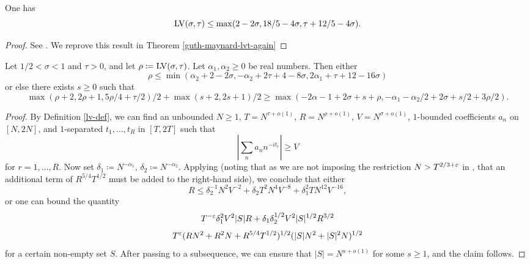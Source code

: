 \begin{theorem}\label{guth-maynard-lvt} One has
$$ \mathrm{LV}(\sigma,\tau) \leq \max(2-2\sigma, 18/5 - 4 \sigma, \tau + 12/5 - 4\sigma).$$
\end{theorem}

\begin{proof}
See \cite[Theorem~1.1]{guth-maynard}. We reprove this result in Theorem \ref{guth-maynard-lvt-again}
\end{proof}

\begin{theorem}\label{bourgain-lvt} \cite{bourgain_large_2000} Let $1/2 < \sigma < 1$ and $\tau > 0$, and let $\rho \coloneqq \mathrm{LV}(\sigma,\tau)$.  Let $\alpha_1, \alpha_2 \geq 0$ be real numbers.  Then either
$$ \rho \leq \min( \alpha_2 + 2 - 2 \sigma, -\alpha_2 + 2\tau+4-8\sigma, 2\alpha_1 + \tau + 12 - 16 \sigma)$$
or else there exists $s \geq 0$ such that
\begin{equation}\label{rs}
     \max(\rho+2, 2\rho+1, 5\rho/4 + \tau/2)/2 + \max(s+2, 2s+1)/2 \geq
\max( -2\alpha-1 + 2\sigma + s + \rho, -\alpha_1 - \alpha_2/2 + 2\sigma + s/2 + 3\rho/2).
\end{equation}
\end{theorem}

\begin{proof}  By Definition \ref{lv-def}, we can find an unbounded $N \geq 1$, $T = N^{\tau+o(1)}$, $R = N^{\rho+o(1)}$, $V = N^{\sigma+o(1)}$, $1$-bounded coefficients $a_n$ on $[N,2N]$, and $1$-separated $t_1,\dots,t_R$ in $[T,2T]$ such that
$$ |\sum_n a_n n^{-it_r}| \geq V$$
for $r=1,\dots,R$.  Now set $\delta_1 \coloneqq N^{-\alpha_1}$, $\delta_2 \coloneqq N^{-\alpha_2}$.  Applying \cite[(4.41), (4.42), (4.55), (4.57)]{bourgain_large_2000} (noting that as we are not imposing the restriction $N > T^{2/3+\varepsilon}$ in \cite[Lemma 3.7]{bourgain_large_2000}, that an additional term of $R^{5/4} T^{1/2}$ must be added to the right-hand side), we conclude that either
$$ R \leq \delta_2^{-1} N^2 V^{-2} + \delta_2 T^2 N^4 V^{-8} + \delta_1^2 T N^{12} V^{-16},$$
or one can bound the quantity
$$ T^{-\varepsilon} \delta_1^2 V^2 |S| R + \delta_1 \delta_2^{1/2} V^2 |S|^{1/2} R^{3/2}$$
$$ T^\varepsilon (RN^2 + R^2 N + R^{5/4} T^{1/2})^{1/2} (|S| N^2 + |S|^2 N)^{1/2}$$
for a certain non-empty set $S$.  After passing to a subsequence, we can ensure that $|S| = N^{s+o(1)}$ for some $s \geq 1$, and the claim follows.
\end{proof}

